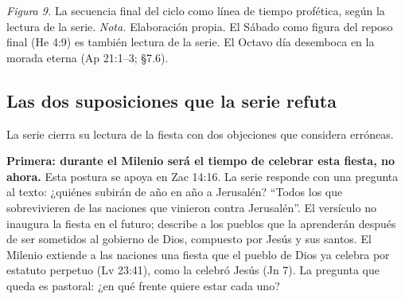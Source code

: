 \documentclass[11pt,letterpaper]{article}
\begin{document}
\begin{center}
\par
{\footnotesize\color{sepia}\textit{Figura 9.} La secuencia final del ciclo como línea de tiempo profética, según la lectura de la serie. \textit{Nota.} Elaboración propia. El Sábado como figura del reposo final (He 4:9) es también lectura de la serie. El Octavo día desemboca en la morada eterna (Ap 21:1--3; §7.6).}
\end{center}

\subsection{Las dos suposiciones que la serie refuta}
La serie cierra su lectura de la fiesta con dos objeciones que considera erróneas.

\textbf{Primera: durante el Milenio será el tiempo de celebrar esta fiesta, no ahora.} Esta postura se apoya en Zac 14:16. La serie responde con una pregunta al texto: ¿quiénes subirán de año en año a Jerusalén? ``Todos los que sobrevivieren de las naciones que vinieron contra Jerusalén''. El versículo no inaugura la fiesta en el futuro; describe a los pueblos que la aprenderán después de ser sometidos al gobierno de Dios, compuesto por Jesús y sus santos. El Milenio extiende a las naciones una fiesta que el pueblo de Dios ya celebra por estatuto perpetuo (Lv 23:41), como la celebró Jesús (Jn 7). La pregunta que queda es pastoral: ¿en qué frente quiere estar cada uno?
\end{document}

